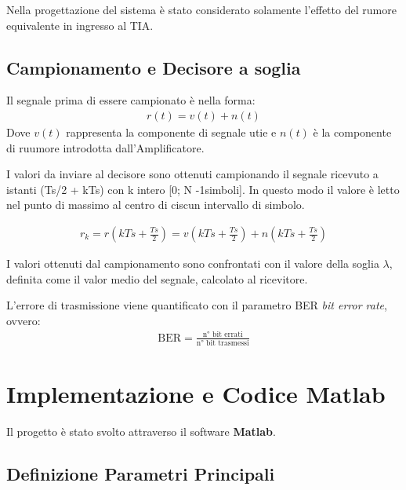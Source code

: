 \documentclass[12pt, a4paper]{article}
\begin{document}
\vspace{5mm}
Nella progettazione del sistema è stato considerato solamente l'effetto del rumore equivalente in ingresso al TIA.



\subsection{Campionamento e Decisore a soglia}
\label{sub:decisore}


Il segnale prima di essere campionato è nella forma:
\begin{align}
	r(t) = v(t) + n(t)
\end{align}
Dove $v(t)$ rappresenta la componente di segnale utie e $n(t)$ è la componente di ruumore introdotta dall'Amplificatore.

I valori da inviare al decisore sono ottenuti campionando il segnale ricevuto a istanti (Ts/2 + kTs) con k intero [0; N -1simboli]. In questo modo il valore è letto nel punto di massimo al centro di ciscun intervallo di simbolo.

\begin{align}
	r_k = r(kTs + \frac{Ts}{2}) = v(kTs + \frac{Ts}{2}) + n(kTs + \frac{Ts}{2})
\end{align}

I valori ottenuti dal campionamento sono confrontati con il valore della soglia $\lambda$, definita come il valor medio del segnale, calcolato al ricevitore.

L'errore di trasmissione viene quantificato con il parametro BER \textit{bit error rate}, ovvero: 
\begin{align*}
	\text{BER} =  \frac{\text{n° bit errati}}{\text{n° bit trasmessi}}
\end{align*}



\newpage
\section{Implementazione e Codice Matlab}
\label{sec:2}

Il progetto è stato svolto attraverso il software \textbf{Matlab}.

\subsection{Definizione Parametri Principali}
\label{sub:2.1}
\end{document}
